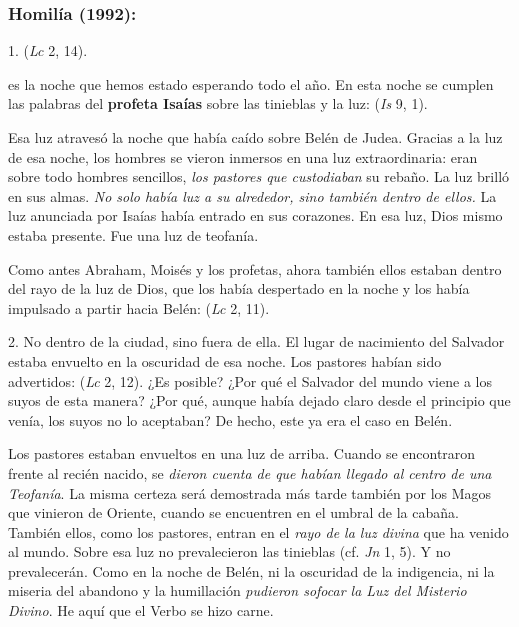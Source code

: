 \subsubsection{Homilía (1992):}


\begin{body}
	1.  (\emph{Lc} 2, 14).
	
	 es la noche que hemos estado esperando todo el año. En esta noche se cumplen las palabras del \textbf{profeta Isaías} sobre las tinieblas y la luz:  (\emph{Is} 9, 1).
	
	Esa luz atravesó la noche que había caído sobre Belén de Judea. Gracias a la luz de esa noche, los hombres se vieron inmersos en una luz extraordinaria: eran sobre todo hombres sencillos, \emph{los pastores que custodiaban} su rebaño. La luz brilló en sus almas. \emph{No solo había luz a su alrededor, sino también dentro de ellos.} La luz anunciada por Isaías había entrado en sus corazones. En esa luz, Dios mismo estaba presente. Fue una luz de teofanía.
	
	Como antes Abraham, Moisés y los profetas, ahora también ellos estaban dentro del rayo de la luz de Dios, que los había despertado en la noche y los había impulsado a partir hacia Belén:  (\emph{Lc} 2, 11).
	
	2. No dentro de la ciudad, sino fuera de ella. El lugar de nacimiento del Salvador estaba envuelto en la oscuridad de esa noche. Los pastores habían sido advertidos:  (\emph{Lc} 2, 12). ¿Es posible? ¿Por qué el Salvador del mundo viene a los suyos de esta manera? ¿Por qué, aunque había dejado claro desde el principio que venía, los suyos no lo aceptaban? De hecho, este ya era el caso en Belén.
	
	Los pastores estaban envueltos en una luz de arriba. Cuando se encontraron frente al recién nacido, se \emph{dieron cuenta de que habían llegado al centro de una Teofanía}. La misma certeza será demostrada más tarde también por los Magos que vinieron de Oriente, cuando se encuentren en el umbral de la cabaña. También ellos, como los pastores, entran en el \emph{rayo de la luz divina} que ha venido al mundo. Sobre esa luz no prevalecieron las tinieblas (cf. \emph{Jn} 1, 5). Y no prevalecerán. Como en la noche de Belén, ni la oscuridad de la indigencia, ni la miseria del abandono y la humillación \emph{pudieron sofocar la Luz del Misterio Divino}. He aquí que el Verbo se hizo carne.
	

\end{body}
